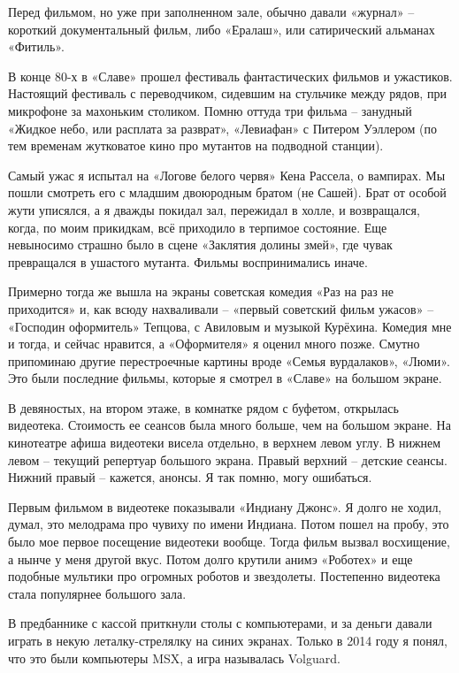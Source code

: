 Перед фильмом, но уже при заполненном зале, обычно давали «журнал» –  короткий документальный фильм, либо «Ералаш», или сатирический альманах «Фитиль».

В конце 80-х в «Славе» прошел фестиваль фантастических фильмов и ужастиков. Настоящий фестиваль с переводчиком, сидевшим на стульчике между рядов, при микрофоне за махоньким столиком. Помню оттуда три фильма – занудный «Жидкое небо, или расплата за разврат», «Левиафан» с Питером Уэллером (по тем временам жутковатое кино про мутантов на подводной станции). 

Самый ужас я испытал на «Логове белого червя» Кена Рассела, о вампирах. Мы пошли смотреть его с младшим двоюродным братом (не Сашей). Брат от особой жути уписялся, а я дважды покидал зал, пережидал в холле, и возвращался, когда, по моим прикидкам, всё приходило в терпимое состояние. Еще невыносимо страшно было в сцене «Заклятия долины змей», где чувак превращался в ушастого мутанта. Фильмы воспринимались иначе.

Примерно тогда же вышла на экраны советская комедия «Раз на раз не приходится» и, как всюду нахваливали – «первый советский фильм ужасов» – «Господин оформитель» Тепцова, с Авиловым и музыкой Курёхина. Комедия мне и тогда, и сейчас нравится, а «Оформителя» я оценил много позже. Смутно припоминаю другие перестроечные картины вроде «Семья вурдалаков», «Люми». Это были последние фильмы, которые я смотрел в «Славе» на большом экране.

В девяностых, на втором этаже, в комнатке рядом с буфетом, открылась видеотека. Стоимость ее сеансов была много больше, чем на большом экране. На кинотеатре афиша видеотеки висела отдельно, в верхнем левом углу. В нижнем левом – текущий репертуар большого экрана. Правый верхний – детские сеансы. Нижний правый – кажется, анонсы. Я так помню, могу ошибаться.

Первым фильмом в видеотеке показывали «Индиану Джонс». Я долго не ходил, думал, это мелодрама про чувиху по имени Индиана. Потом пошел на пробу, это было мое первое посещение видеотеки вообще. Тогда фильм вызвал восхищение, а нынче у меня другой вкус. Потом долго крутили анимэ «Роботех» и еще подобные мультики про огромных роботов и звездолеты. Постепенно видеотека стала популярнее большого зала.

В предбаннике с кассой приткнули столы с компьютерами, и за деньги давали играть в некую леталку-стрелялку на синих экранах. Только в 2014 году я понял, что это были компьютеры MSX, а игра называлась Volguard.

